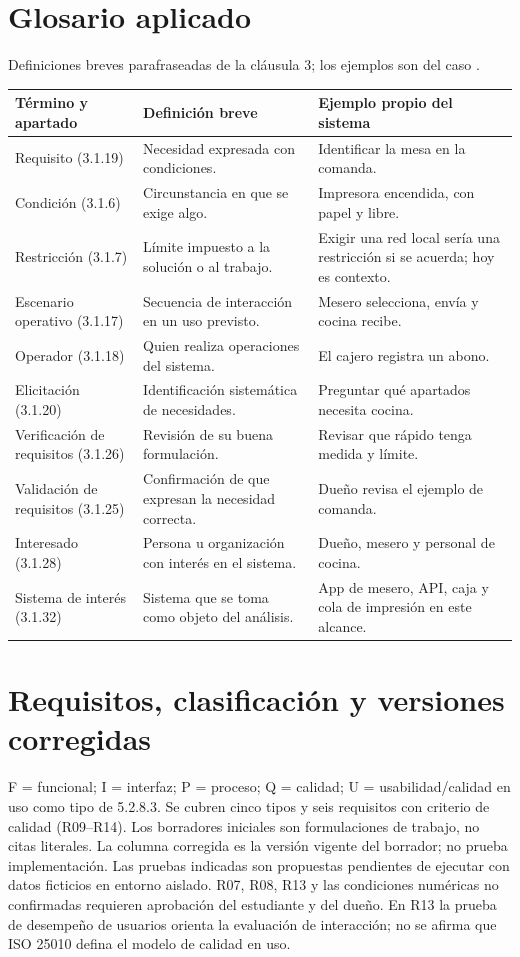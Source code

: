 \documentclass[11pt,a4paper]{article}
\renewcommand{\arraystretch}{1.12}
\begin{document}
\section{Glosario aplicado}
Definiciones breves parafraseadas de la cláusula 3; los ejemplos son del caso \cite{iso29148}.
\begingroup\scriptsize\renewcommand{\arraystretch}{1.12}
\begin{longtable}{|L{3.2cm}|L{4.6cm}|L{7.4cm}|}
\hline\textbf{Término y apartado} & \textbf{Definición breve} & \textbf{Ejemplo propio del sistema} \\\hline
Requisito (3.1.19) & Necesidad expresada con condiciones. & Identificar la mesa en la comanda. \\ \hline
Condición (3.1.6) & Circunstancia en que se exige algo. & Impresora encendida, con papel y libre. \\ \hline
Restricción (3.1.7) & Límite impuesto a la solución o al trabajo. & Exigir una red local sería una restricción si se acuerda; hoy es contexto. \\ \hline
Escenario operativo (3.1.17) & Secuencia de interacción en un uso previsto. & Mesero selecciona, envía y cocina recibe. \\ \hline
Operador (3.1.18) & Quien realiza operaciones del sistema. & El cajero registra un abono. \\ \hline
Elicitación (3.1.20) & Identificación sistemática de necesidades. & Preguntar qué apartados necesita cocina. \\ \hline
Verificación de requisitos (3.1.26) & Revisión de su buena formulación. & Revisar que rápido tenga medida y límite. \\ \hline
Validación de requisitos (3.1.25) & Confirmación de que expresan la necesidad correcta. & Dueño revisa el ejemplo de comanda. \\ \hline
Interesado (3.1.28) & Persona u organización con interés en el sistema. & Dueño, mesero y personal de cocina. \\ \hline
Sistema de interés (3.1.32) & Sistema que se toma como objeto del análisis. & App de mesero, API, caja y cola de impresión en este alcance. \\ \hline
\end{longtable}
\endgroup

\section{Requisitos, clasificación y versiones corregidas}
F = funcional; I = interfaz; P = proceso; Q = calidad; U = usabilidad/calidad en uso como tipo de 5.2.8.3. Se cubren cinco tipos y seis requisitos con criterio de calidad (R09--R14). Los borradores iniciales son formulaciones de trabajo, no citas literales. La columna corregida es la versión vigente del borrador; no prueba implementación. Las pruebas indicadas son propuestas pendientes de ejecutar con datos ficticios en entorno aislado. R07, R08, R13 y las condiciones numéricas no confirmadas requieren aprobación del estudiante y del dueño. En R13 la prueba de desempeño de usuarios orienta la evaluación de interacción; no se afirma que ISO 25010 defina el modelo de calidad en uso.
\end{document}

